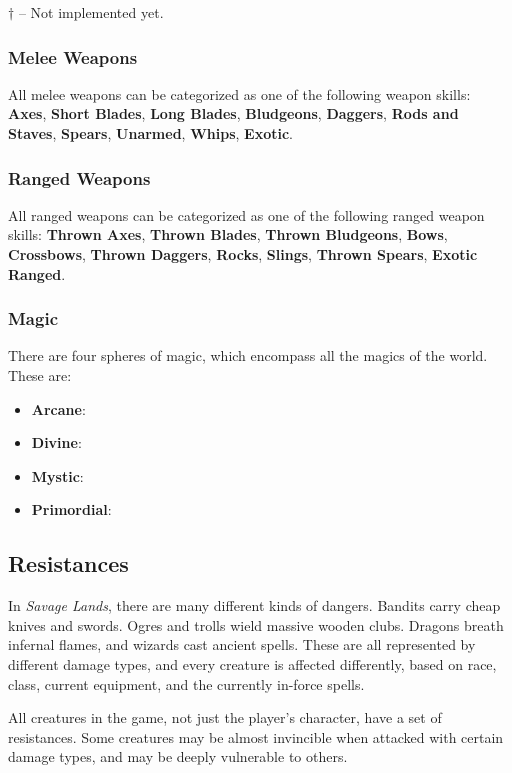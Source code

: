 \documentclass{article}
\begin{document}
$\dagger$ -- Not implemented yet.

\subsubsection{Melee Weapons}

All melee weapons can be categorized as one of the following weapon skills: {\bf Axes}, {\bf Short Blades}, {\bf Long Blades}, {\bf Bludgeons}, {\bf Daggers}, {\bf Rods and Staves}, {\bf Spears}, {\bf Unarmed}, {\bf Whips}, {\bf Exotic}.

\subsubsection{Ranged Weapons}

All ranged weapons can be categorized as one of the following ranged weapon skills: {\bf Thrown Axes}, {\bf Thrown Blades}, {\bf Thrown Bludgeons}, {\bf Bows}, {\bf Crossbows}, {\bf Thrown Daggers}, {\bf Rocks}, {\bf Slings}, {\bf Thrown Spears}, {\bf Exotic Ranged}.

\subsubsection{Magic}

There are four spheres of magic, which encompass all the magics of the world.  These are:

\begin{itemize}
\item {\bf Arcane}:
\item {\bf Divine}:
\item {\bf Mystic}:
\item {\bf Primordial}:
\end{itemize}

\subsection{Resistances}

In {\it Savage Lands}, there are many different kinds of dangers.  Bandits
carry cheap knives and swords.  Ogres and trolls wield massive wooden
clubs.  Dragons breath infernal flames, and wizards cast ancient spells.
These are all represented by different damage types, and every creature
is affected differently, based on race, class, current equipment, and
the currently in-force spells.

All creatures in the game, not just the player's character, have a set of 
resistances.  Some creatures may be almost invincible when attacked with
certain damage types, and may be deeply vulnerable to others.
\end{document}
